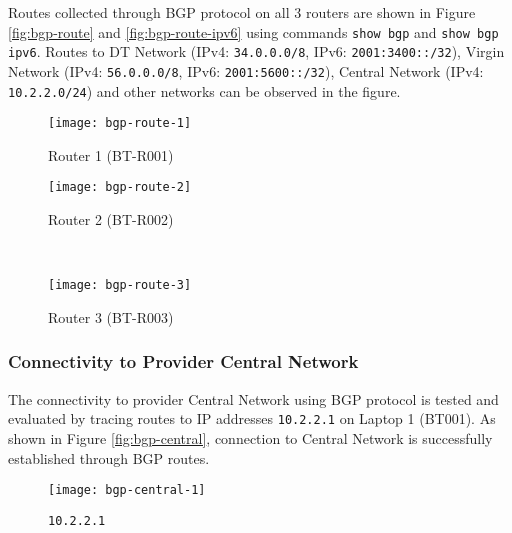 Routes collected through BGP protocol on all $3$ routers are shown in Figure \ref{fig:bgp-route} and \ref{fig:bgp-route-ipv6} using commands \texttt{show bgp} and \texttt{show bgp ipv6}. 
Routes to DT Network (IPv4: \texttt{34.0.0.0/8}, IPv6: \texttt{2001:3400::/32}), Virgin Network (IPv4: \texttt{56.0.0.0/8}, IPv6: \texttt{2001:5600::/32}), Central Network (IPv4: \texttt{10.2.2.0/24}) and other networks can be observed in the figure.

\begin{figure*}[ht!]
    \centering
    \begin{subfigure}[b]{0.67\textwidth}
        \centering
        \texttt{[image: bgp-route-1]}
        \caption{Router 1 (BT-R001)}
    \end{subfigure}
    \hfill
    \begin{minipage}[b]{0.3\textwidth}
	    \begin{subfigure}[b]{\linewidth}
	        \centering
	        \texttt{[image: bgp-route-2]}
	        \caption{Router 2 (BT-R002)}
	    \end{subfigure}
	    \\
	    \begin{subfigure}[b]{\linewidth}
	        \centering
	        \texttt{[image: bgp-route-3]}
	        \caption{Router 3 (BT-R003)}
	    \end{subfigure}
	\end{minipage}
    \caption{IPv4 Routes Collected through BGP Protocols on All $3$ Routers using \texttt{show bgp}.}
    \label{fig:bgp-route}
\end{figure*}



\clearpage


\subsubsection{Connectivity to Provider Central Network}

The connectivity to provider Central Network using BGP protocol is tested and evaluated by tracing routes to IP addresses \texttt{10.2.2.1} on Laptop 1 (BT001). As shown in Figure \ref{fig:bgp-central}, connection to Central Network is successfully established through BGP routes.

\begin{figure*}[ht!]
    \centering
    \begin{subfigure}[b]{\textwidth}
        \centering
        \texttt{[image: bgp-central-1]}
        \caption{\texttt{10.2.2.1}}
    \end{subfigure}
    ~
    \caption{Tracing IPv4 Routes to Central Network on Laptop 1 (BT001) using \texttt{traceroute}.}
    \label{fig:bgp-central}
\end{figure*}


